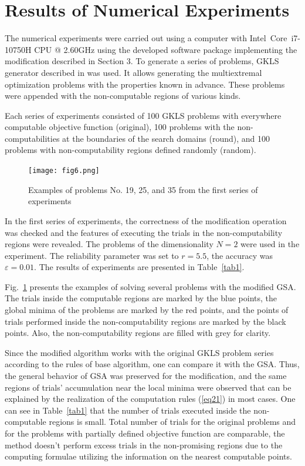 \documentclass[runningheads]{llncs}
\begin{document}
\section{Results of Numerical Experiments}

The numerical experiments were carried out using a computer with Intel\textregistered\ Core\texttrademark\ i7-10750H CPU @ 2.60GHz using the developed software package implementing the modification described in Section 3. To generate a series of problems, GKLS generator described in \cite{Gaviano2003} was used. It allows generating the multiextremal optimization problems with the properties known in advance. These problems were appended with the non-computable regions of various kinds.

Each series of experiments consisted of 100 GKLS problems with everywhere computable objective function (original), 100 problems with the non-computabilities at the boundaries of the search domains (round), and 100 problems with non-computability regions defined randomly (random).

\begin{figure}[h]
\texttt{[image: fig6.png]}
\caption{Examples of problems No. 19, 25, and 35 from the first series of experiments} \label{fig6}
\end{figure}

In the first series of experiments, the correctness of the modification operation was checked and the features of executing the trials in the non-computability regions were revealed. The problems of the dimensionality $N=2$ were used in the experiment. The reliability parameter was set to $r=5.5$, the accuracy was $\varepsilon=0.01$. The results of experiments are presented in Table~\ref{tab1}.

Fig.~\ref{fig6} presents the examples of solving several problems with the modified GSA. The trials inside the computable regions are marked by the blue points, the global minima of the problems are marked by the red points, and the points of trials performed inside the non-computability regions are marked by the black points. Also, the non-computability regions are filled with grey for clarity.

Since the modified algorithm works with the original GKLS problem series according to the rules of base algorithm, one can compare it with the GSA. Thus, the general behavior of GSA was preserved for the modification, and the same regions of trials' accumulation near the local minima were observed that can be explained by the realization of the  computation rules (\ref{eq21}) in most cases. One can see in Table~\ref{tab1} that the number of trials executed inside the non-computable regions is small. Total number of trials for the original problems and for the problems with partially defined objective function are comparable, the method doesn't perform excess trials in the non-promising regions due to the computing formulae utilizing the information on the nearest computable points.
\end{document}
